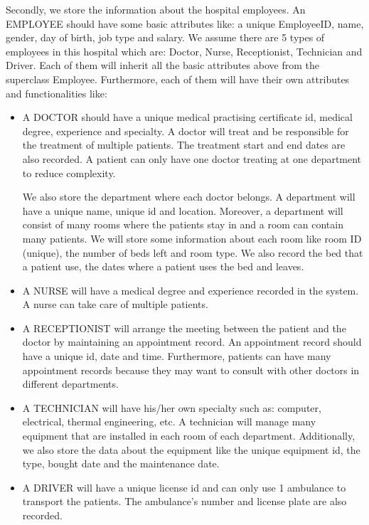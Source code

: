 \documentclass[a4paper]{article}
\numberwithin{equation}{section}
\begin{document}
Secondly, we store the information about the hospital employees.
An EMPLOYEE should have some basic attributes like: a unique EmployeeID, name, gender, day of birth, job type and salary.
We assume there are 5 types of employees in this hospital which are: Doctor, Nurse, Receptionist, Technician and Driver.
Each of them will inherit all the basic attributes above from the superclass Employee.
Furthermore, each of them will have their own attributes and functionalities like:
\begin{itemize}
  \item  A DOCTOR should have a unique medical practising certificate id, medical degree, experience and specialty.
        A doctor will treat and be responsible for the treatment of multiple patients.
        The treatment start and end dates are also recorded.
        A patient can only have one doctor treating at one department to reduce complexity.

        We also store the department where each doctor belongs.
        A department will have a unique name, unique id and location.
        Moreover, a department will consist of many rooms where the patients stay in and a room can contain many patients.
        We will store some information about each room like room ID (unique), the number of beds left and room type.
        We also record the bed that a patient use, the dates where a patient uses the bed and leaves.

  \item A NURSE will have a medical degree and experience recorded in the system.
        A nurse can take care of multiple patients.

  \item A RECEPTIONIST will arrange the meeting between the patient and the doctor by maintaining an appointment record.
        An appointment record should have a unique id, date and time.
        Furthermore, patients can have many appointment records because they may want to consult with other doctors in different departments.

  \item A TECHNICIAN will have his/her own specialty such as: computer, electrical, thermal engineering, etc\@.
        A technician will manage many equipment that are installed in each room of each department.
        Additionally, we also store the data about the equipment like the unique equipment id, the type, bought date and the maintenance date.

  \item A DRIVER will have a unique license id and can only use 1 ambulance to transport the patients.
        The ambulance's number and license plate are also recorded.
\end{itemize}
\end{document}
